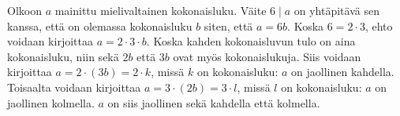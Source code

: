 \begin{Vastaus}{40}
	
\end{Vastaus}
\begin{Vastaus}{41}
\end{Vastaus}
\begin{Vastaus}{42}
\end{Vastaus}
\begin{Vastaus}{43}
\end{Vastaus}
\begin{Vastaus}{44}
	Olkoon $a$ mainittu mielivaltainen kokonaisluku. Väite $6\mid a$ on yhtäpitävä sen kanssa, että on olemassa kokonaisluku $b$ siten, että $a=6b$. Koska $6=2\cdot3$, ehto voidaan kirjoittaa $a=2\cdot3\cdot b$. Koska kahden kokonaisluvun tulo on aina kokonaisluku, niin sekä $2b$ että $3b$ ovat myös kokonaislukuja. Siis voidaan kirjoittaa $a=2\cdot (3b)=2\cdot k$, missä $k$ on kokonaisluku: $a$ on jaollinen kahdella. Toisaalta voidaan kirjoittaa $a=3\cdot (2b)=3\cdot l$, missä $l$ on kokonaisluku: $a$ on jaollinen kolmella. $a$ on siis jaollinen sekä kahdella että kolmella.
	
\end{Vastaus}
\begin{Vastaus}{45}
	
\end{Vastaus}
\begin{Vastaus}{46}
	
\end{Vastaus}
\begin{Vastaus}{47}
	
\end{Vastaus}
\begin{Vastaus}{48}
	
\end{Vastaus}
